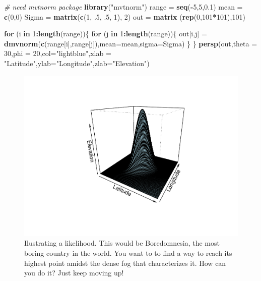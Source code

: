 \documentclass[
]{book}
\newenvironment{Shaded}{\begin{snugshade}}{\end{snugshade}}
\newcommand{\CommentTok}[1]{\textcolor[rgb]{0.56,0.35,0.01}{\textit{#1}}}
\newcommand{\ControlFlowTok}[1]{\textcolor[rgb]{0.13,0.29,0.53}{\textbf{#1}}}
\newcommand{\DataTypeTok}[1]{\textcolor[rgb]{0.13,0.29,0.53}{#1}}
\newcommand{\DecValTok}[1]{\textcolor[rgb]{0.00,0.00,0.81}{#1}}
\newcommand{\FloatTok}[1]{\textcolor[rgb]{0.00,0.00,0.81}{#1}}
\newcommand{\KeywordTok}[1]{\textcolor[rgb]{0.13,0.29,0.53}{\textbf{#1}}}
\newcommand{\NormalTok}[1]{#1}
\newcommand{\OperatorTok}[1]{\textcolor[rgb]{0.81,0.36,0.00}{\textbf{#1}}}
\newcommand{\StringTok}[1]{\textcolor[rgb]{0.31,0.60,0.02}{#1}}
\begin{document}
\begin{Shaded}
\begin{Highlighting}[]
\CommentTok{# need mvtnorm package}
\KeywordTok{library}\NormalTok{(}\StringTok{"mvtnorm"}\NormalTok{)}
\NormalTok{range =}\StringTok{ }\KeywordTok{seq}\NormalTok{(}\OperatorTok{-}\DecValTok{5}\NormalTok{,}\DecValTok{5}\NormalTok{,}\FloatTok{0.1}\NormalTok{)}
\NormalTok{mean =}\StringTok{ }\KeywordTok{c}\NormalTok{(}\DecValTok{0}\NormalTok{,}\DecValTok{0}\NormalTok{)}
\NormalTok{Sigma =}\StringTok{ }\KeywordTok{matrix}\NormalTok{(}\KeywordTok{c}\NormalTok{(}\DecValTok{1}\NormalTok{, }\FloatTok{.5}\NormalTok{, }\FloatTok{.5}\NormalTok{, }\DecValTok{1}\NormalTok{), }\DecValTok{2}\NormalTok{)}
\NormalTok{out =}\StringTok{ }\KeywordTok{matrix}\NormalTok{ (}\KeywordTok{rep}\NormalTok{(}\DecValTok{0}\NormalTok{,}\DecValTok{101}\OperatorTok{*}\DecValTok{101}\NormalTok{),}\DecValTok{101}\NormalTok{)}

\ControlFlowTok{for}\NormalTok{ (i }\ControlFlowTok{in} \DecValTok{1}\OperatorTok{:}\KeywordTok{length}\NormalTok{(range))\{}
	\ControlFlowTok{for}\NormalTok{ (j }\ControlFlowTok{in} \DecValTok{1}\OperatorTok{:}\KeywordTok{length}\NormalTok{(range))\{}
\NormalTok{		out[i,j] =}\StringTok{ }\KeywordTok{dmvnorm}\NormalTok{(}\KeywordTok{c}\NormalTok{(range[i],range[j]),}\DataTypeTok{mean=}\NormalTok{mean,}\DataTypeTok{sigma=}\NormalTok{Sigma)}
\NormalTok{	\}}
\NormalTok{\}}
 \KeywordTok{persp}\NormalTok{(out,}\DataTypeTok{theta =} \DecValTok{30}\NormalTok{,}\DataTypeTok{phi =} \DecValTok{20}\NormalTok{,}\DataTypeTok{col=}\StringTok{"lightblue"}\NormalTok{,}\DataTypeTok{xlab =} \StringTok{"Latitude"}\NormalTok{,}\DataTypeTok{ylab=}\StringTok{"Longitude"}\NormalTok{,}\DataTypeTok{zlab=}\StringTok{"Elevation"}\NormalTok{)}
\end{Highlighting}
\end{Shaded}

\begin{figure}

{\centering \includegraphics[width=0.8\linewidth]{ECOMODbook_files/figure-latex/country-1} 

}

\caption{Ilustrating a likelihood. This would be Boredomnesia, the most boring country in the world. You want to to find a way to reach its highest point amidst the dense fog that characterizes it. How can you do it? Just keep moving up!}\label{fig:country}
\end{figure}
\end{document}

